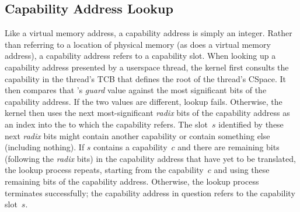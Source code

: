 \subsection{Capability Address Lookup}
\label{sec:cap_address_lookup}
Like a virtual memory address, a capability address is simply an
integer. Rather than referring to a location of physical memory (as
does a virtual memory address), a capability address refers to a
capability slot.  When looking up a capability address presented by a
userspace thread, the kernel first consults the  capability
in the thread's TCB that defines the root of the thread's CSpace. It
then compares that 's \emph{guard} value against the most
significant bits of the capability address.  If the two values are
different, lookup fails. Otherwise, the kernel then uses the next
most-significant \emph{radix} bits of the capability address as an
index into the  to which the  capability
refers. The slot~$s$ identified by these next \emph{radix} bits might
contain another  capability or contain something else
(including nothing).  If $s$ contains a  capability~$c$ and
there are remaining bits (following the \emph{radix} bits) in the
capability address that have yet to be translated, the lookup process
repeats, starting from the  capability~$c$ and using these
remaining bits of the capability address. Otherwise, the lookup
process terminates successfully; the capability address in question
refers to the capability slot~$s$.

